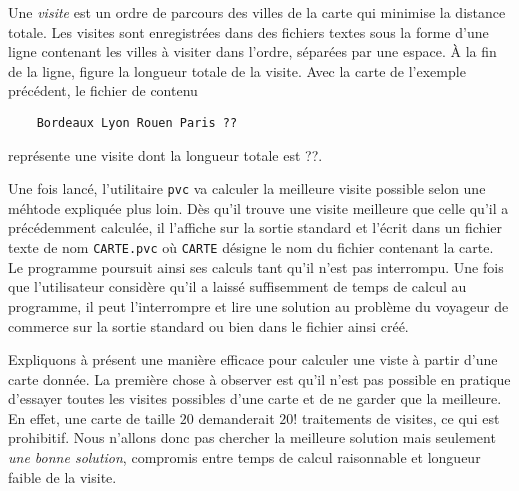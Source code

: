 \documentclass[12pt]{article}
\theoremstyle{definition}
\begin{document}
Une {\em visite}
est un ordre de parcours des villes de la carte qui minimise la distance 
totale. Les visites sont enregistrées dans des fichiers textes sous la 
forme d'une ligne contenant les villes à visiter dans l'ordre, séparées 
par une espace. À la fin de la ligne, figure la longueur totale de la
visite. Avec la carte de l'exemple précédent, le fichier de contenu
\begin{verbatim}
    Bordeaux Lyon Rouen Paris ??
\end{verbatim}
représente une visite dont la longueur totale est ??.
\medskip

Une fois lancé, l'utilitaire {\tt pvc} va calculer la meilleure visite 
possible selon une méhtode expliquée plus loin. Dès qu'il trouve une
visite meilleure que celle qu'il a précédemment calculée, il l'affiche
sur la sortie standard et l'écrit dans un fichier texte de nom 
{\tt CARTE.pvc} où {\tt CARTE} désigne le nom du fichier contenant la 
carte. Le programme poursuit ainsi ses calculs tant qu'il n'est
pas interrompu. Une fois que l'utilisateur considère qu'il a laissé
suffisemment de temps de calcul au programme, il peut l'interrompre
et lire une solution au problème du 
voyageur de commerce sur la sortie standard ou bien dans le fichier
ainsi créé.
\medskip

Expliquons à présent une manière efficace pour calculer une viste 
à partir d'une carte donnée. La première chose à observer est qu'il
n'est pas possible en pratique d'essayer toutes les visites possibles
d'une carte et de ne garder que la meilleure. En effet, une carte 
de taille $20$ demanderait $20!$ traitements de visites, ce qui est
prohibitif. Nous n'allons donc pas chercher la meilleure solution mais
seulement {\em une bonne solution}, compromis entre temps de calcul
raisonnable et longueur faible de la visite.
\medskip
\end{document}
